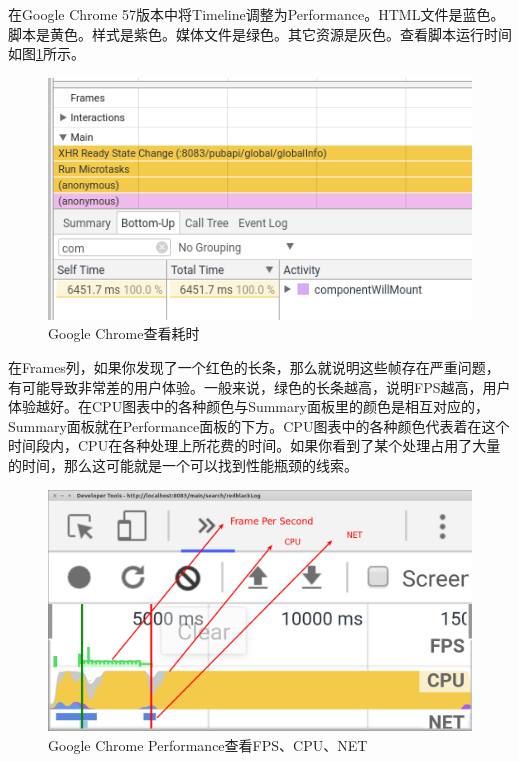 \documentclass[12pt]{book}
\numberwithin{dummy}{section}
\theoremstyle{ocrenumbox}
\theoremstyle{blacknumex}
\theoremstyle{blacknumbox}
\theoremstyle{ocrenum}
\begin{document}
在Google Chrome 57版本中将Timeline调整为Performance。HTML文件是蓝色。脚本是黄色。样式是紫色。媒体文件是绿色。其它资源是灰色。查看脚本运行时间如图\ref{fig:componentwillmountcheck}所示。

\begin{figure}[htbp]
	\centering
	\includegraphics[scale=0.5]{componentwillmountcheck.png}
	\caption{Google Chrome查看耗时}
	\label{fig:componentwillmountcheck}
\end{figure}

在Frames列，如果你发现了一个红色的长条，那么就说明这些帧存在严重问题，有可能导致非常差的用户体验。一般来说，绿色的长条越高，说明FPS越高，用户体验越好。在CPU图表中的各种颜色与Summary面板里的颜色是相互对应的，Summary面板就在Performance面板的下方。CPU图表中的各种颜色代表着在这个时间段内，CPU在各种处理上所花费的时间。如果你看到了某个处理占用了大量的时间，那么这可能就是一个可以找到性能瓶颈的线索。

\begin{figure}[htbp]
	\centering
	\includegraphics[scale=0.3]{chromeperformancegraph.png}
	\caption{Google Chrome Performance查看FPS、CPU、NET}
	\label{fig:chromeperformancegraph}
\end{figure}
\end{document}
